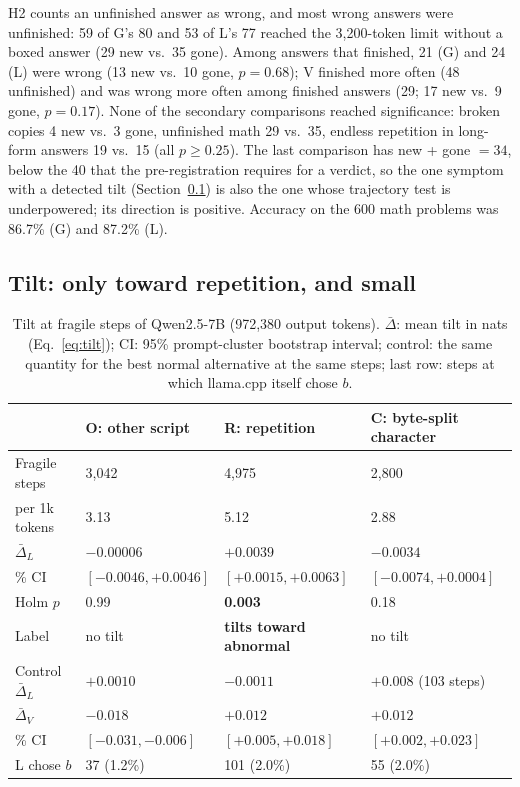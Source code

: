 \documentclass[11pt]{article}
\begin{document}
H2 counts an unfinished answer as wrong, and most wrong answers were unfinished: 59 of G's 80 and 53 of L's 77 reached the
3,200-token limit without a boxed answer (29 new vs.\ 35 gone). Among answers that finished, 21 (G) and 24 (L) were wrong
(13 new vs.\ 10 gone, $p=0.68$); V finished more often (48 unfinished) and was wrong more often among finished answers (29;
17 new vs.\ 9 gone, $p=0.17$). None of the secondary comparisons reached significance: broken copies 4 new vs.\ 3 gone,
unfinished math 29 vs.\ 35, endless repetition in long-form answers 19 vs.\ 15 (all $p\ge 0.25$). The last comparison has
new + gone $=34$, below the 40 that the pre-registration requires for a verdict, so the one symptom with a detected tilt
(Section~\ref{sec:tilt-results}) is also the one whose trajectory test is underpowered; its direction is positive. Accuracy
on the 600 math problems was 86.7\% (G) and 87.2\% (L).

\subsection{Tilt: only toward repetition, and small}\label{sec:tilt-results}

\begin{table}[t]
\centering
\small
\caption{Tilt at fragile steps of Qwen2.5-7B (972,380 output tokens). $\bar{\Delta}$: mean tilt in nats
(Eq.~\ref{eq:tilt}); CI: 95\% prompt-cluster bootstrap interval; control: the same quantity for the best normal alternative
at the same steps; last row: steps at which llama.cpp itself chose $b$.}
\label{tab:tilt}
\begin{tabular}{@{}l lll@{}}
\toprule
 & O: other script & R: repetition & C: byte-split character \\
\midrule
Fragile steps & 3,042 & 4,975 & 2,800 \\
\quad per 1k tokens & 3.13 & 5.12 & 2.88 \\
\addlinespace
$\bar{\Delta}_L$ & $-0.00006$ & $\mathbf{+0.0039}$ & $-0.0034$ \\
\quad 95\% CI & $[-0.0046, +0.0046]$ & $\mathbf{[+0.0015, +0.0063]}$ & $[-0.0074, +0.0004]$ \\
\quad Holm $p$ & 0.99 & \textbf{0.003} & 0.18 \\
\quad Label & no tilt & \textbf{tilts toward abnormal} & no tilt \\
\quad Control $\bar{\Delta}_L$ & $+0.0010$ & $-0.0011$ & $+0.008$ (103 steps) \\
\addlinespace
$\bar{\Delta}_V$ & $-0.018$ & $+0.012$ & $+0.012$ \\
\quad 95\% CI & $[-0.031, -0.006]$ & $[+0.005, +0.018]$ & $[+0.002, +0.023]$ \\
\addlinespace
L chose $b$ & 37 (1.2\%) & 101 (2.0\%) & 55 (2.0\%) \\
\bottomrule
\end{tabular}
\end{table}
\end{document}
